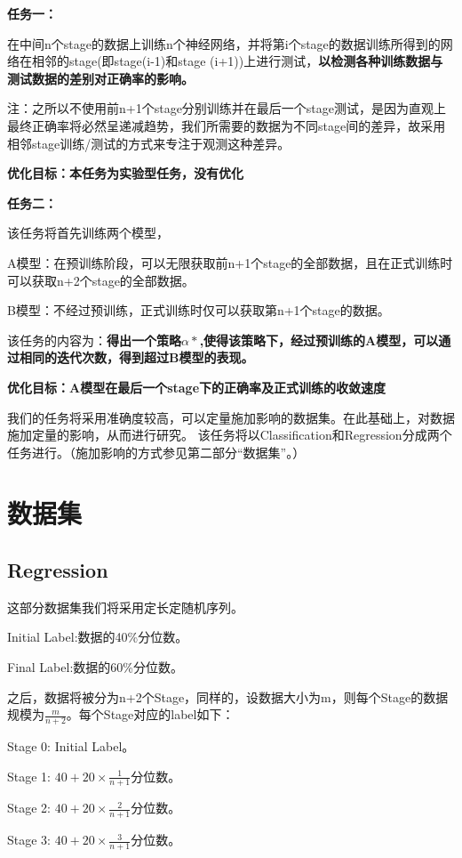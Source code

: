 \documentclass{article}
\begin{document}
\textbf{任务一：}

在中间n个stage的数据上训练n个神经网络，并将第i个stage的数据训练所得到的网络在相邻的stage(即stage(i-1)和stage (i+1))上进行测试，\textbf{以检测各种训练数据与测试数据的差别对正确率的影响。}

注：之所以不使用前n+1个stage分别训练并在最后一个stage测试，是因为直观上最终正确率将必然呈递减趋势，我们所需要的数据为不同stage间的差异，故采用相邻stage训练/测试的方式来专注于观测这种差异。

\textbf{优化目标：本任务为实验型任务，没有优化}

\textbf{任务二：}

该任务将首先训练两个模型，

A模型：在预训练阶段，可以无限获取前n+1个stage的全部数据，且在正式训练时可以获取n+2个stage的全部数据。

B模型：不经过预训练，正式训练时仅可以获取第n+1个stage的数据。

该任务的内容为：\textbf{得出一个策略$\alpha*$,使得该策略下，经过预训练的A模型，可以通过相同的迭代次数，得到超过B模型的表现。}

\textbf{优化目标：A模型在最后一个stage下的正确率及正式训练的收敛速度}

我们的任务将采用准确度较高，可以定量施加影响的数据集。在此基础上，对数据施加定量的影响，从而进行研究。
该任务将以Classification和Regression分成两个任务进行。（施加影响的方式参见第二部分“数据集”。）

\section{数据集}

\subsection{Regression}
这部分数据集我们将采用定长定随机序列。

Initial Label:数据的40\%分位数。

Final Label:数据的60\%分位数。

之后，数据将被分为n+2个Stage，同样的，设数据大小为m，则每个Stage的数据规模为$\frac{m}{n+2}$。每个Stage对应的label如下：

Stage 0: Initial Label。

Stage 1: $40+20\times \frac{1}{n+1}$分位数。

Stage 2: $40+20 \times \frac{2}{n+1}$分位数。

Stage 3: $40+20 \times \frac{3}{n+1}$分位数。
\end{document}
